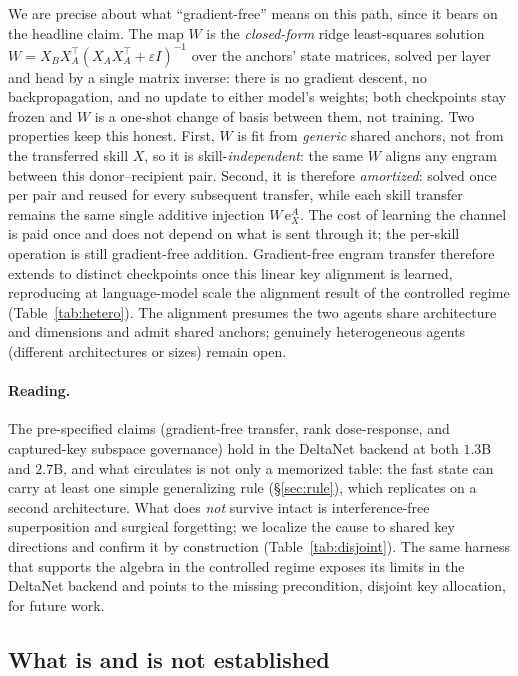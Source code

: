 \documentclass[11pt]{article}
\theoremstyle{definition}
\begin{document}
We are precise about what ``gradient-free'' means on this path, since it bears on the headline claim. The map $W$ is the \emph{closed-form} ridge least-squares solution $W = X_B X_A^\top (X_A X_A^\top + \varepsilon I)^{-1}$ over the anchors' state matrices, solved per layer and head by a single matrix inverse: there is no gradient descent, no backpropagation, and no update to either model's weights; both checkpoints stay frozen and $W$ is a one-shot change of basis between them, not training. Two properties keep this honest. First, $W$ is fit from \emph{generic} shared anchors, not from the transferred skill $X$, so it is skill-\emph{independent}: the same $W$ aligns any engram between this donor--recipient pair. Second, it is therefore \emph{amortized}: solved once per pair and reused for every subsequent transfer, while each skill transfer remains the same single additive injection $W\,\mathrm{e}_X^A$. The cost of learning the channel is paid once and does not depend on what is sent through it; the per-skill operation is still gradient-free addition. Gradient-free engram transfer therefore extends to distinct checkpoints once this linear key alignment is learned, reproducing at language-model scale the alignment result of the controlled regime (Table~\ref{tab:hetero}). The alignment presumes the two agents share architecture and dimensions and admit shared anchors; genuinely heterogeneous agents (different architectures or sizes) remain open.

\paragraph{Reading.}
The pre-specified claims (gradient-free transfer, rank dose-response, and captured-key subspace governance) hold in the DeltaNet backend at both $1.3$B and $2.7$B, and what circulates is not only a memorized table: the fast state can carry at least one simple generalizing rule (\S\ref{sec:rule}), which replicates on a second architecture. What does \emph{not} survive intact is interference-free superposition and surgical forgetting; we localize the cause to shared key directions and confirm it by construction (Table~\ref{tab:disjoint}). The same harness that supports the algebra in the controlled regime exposes its limits in the DeltaNet backend and points to the missing precondition, disjoint key allocation, for future work.

\subsection{What is and is not established}
\end{document}
